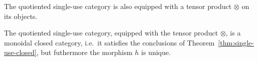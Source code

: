 The quotiented single-use category is also equipped with a tensor product $\otimes$ on its objects.
\begin{theorem}
    The quotiented single-use category, equipped with the tensor product $\otimes$, is a monoidal closed category, i.e.~it satisfies the conclusions of Theorem~\ref{thm:single-use-closed}, but futhermore the morphism $h$ is unique.
\end{theorem}

